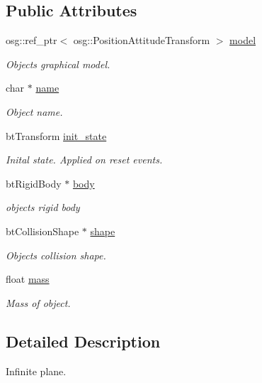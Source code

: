 \subsection*{Public Attributes}
\begin{DoxyCompactItemize}
\item 
osg\+::ref\+\_\+ptr$<$ osg\+::\+Position\+Attitude\+Transform $>$ \mbox{\hyperlink{classbtosgObject_afd15726e7a214212d6d5815f8ac1ac6c}{model}}
\begin{DoxyCompactList}\small\item\em Object\textquotesingle{}s graphical model. \end{DoxyCompactList}\item 
char $\ast$ \mbox{\hyperlink{classbtosgObject_a12396e1362797a75473a2e833b579cc9}{name}}
\begin{DoxyCompactList}\small\item\em Object name. \end{DoxyCompactList}\item 
bt\+Transform \mbox{\hyperlink{classbtosgObject_a2dee023f311114e200df9b04c8c1b400}{init\+\_\+state}}
\begin{DoxyCompactList}\small\item\em Inital state. Applied on reset events. \end{DoxyCompactList}\item 
bt\+Rigid\+Body $\ast$ \mbox{\hyperlink{classbtosgObject_a64ccde0543c184ed1749fdb9c9699785}{body}}
\begin{DoxyCompactList}\small\item\em object\textquotesingle{}s rigid body \end{DoxyCompactList}\item 
bt\+Collision\+Shape $\ast$ \mbox{\hyperlink{classbtosgObject_a0f6a8da01cf643c321bffe86e42604b0}{shape}}
\begin{DoxyCompactList}\small\item\em Object\textquotesingle{}s collision shape. \end{DoxyCompactList}\item 
float \mbox{\hyperlink{classbtosgObject_a2418bb2194d5e9b0f1c51c84672ba7d1}{mass}}
\begin{DoxyCompactList}\small\item\em Mass of object. \end{DoxyCompactList}\end{DoxyCompactItemize}


\subsection{Detailed Description}
Infinite plane. 

